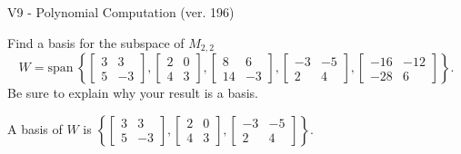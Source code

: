\begin{exercise}
  \begin{exerciseTitle}V9 - Polynomial Computation (ver. 196)\end{exerciseTitle}
  \begin{exerciseStatement}
    Find a basis for the subspace of \(M_{2,2}\) 
\[W=\mathrm{span}\ \left\{\left[\begin{array}{cc}
3 & 3 \\
5 & -3
\end{array}\right] , \left[\begin{array}{cc}
2 & 0 \\
4 & 3
\end{array}\right] , \left[\begin{array}{cc}
8 & 6 \\
14 & -3
\end{array}\right] , \left[\begin{array}{cc}
-3 & -5 \\
2 & 4
\end{array}\right] , \left[\begin{array}{cc}
-16 & -12 \\
-28 & 6
\end{array}\right]\right\}.\]
 Be sure to explain why your result is a basis.


  \end{exerciseStatement}
  \begin{exerciseAnswer}
   A basis of \(W\) is  \(\left\{\left[\begin{array}{cc}
3 & 3 \\
5 & -3
\end{array}\right] , \left[\begin{array}{cc}
2 & 0 \\
4 & 3
\end{array}\right] , \left[\begin{array}{cc}
-3 & -5 \\
2 & 4
\end{array}\right]\right\}\).
  


  \end{exerciseAnswer}
\end{exercise}